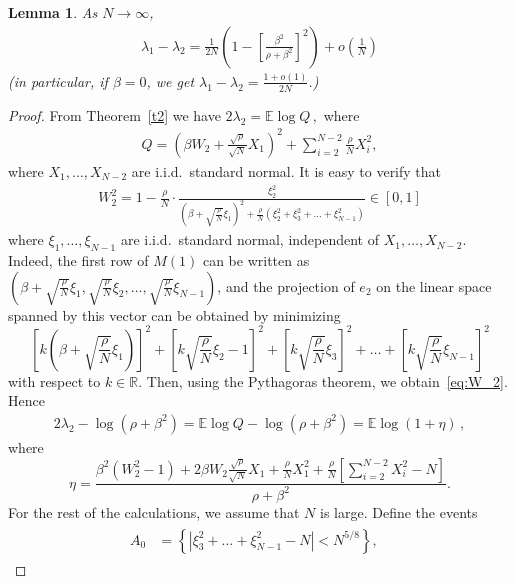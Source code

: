 \documentclass[12pt]{article}
\newtheorem{lemma}{Lemma}
\newcommand{\E}{\mathbb{E}}
\newcommand{\R}{\mathbb{R}}
\newcommand{\1}{\mathbf{1}}
\begin{document}
\begin{lemma}\label{lem:lam1lam2}
As $N\to\infty$,
\begin{align}\label{eq:lam1lam2}
\lambda_1-\lambda_2=\frac1{2N}
\left(1-\left[\frac{\beta^2}{\rho+\beta^2}\right]^2\right)+o\left(\frac1N\right) 
\end{align}
(in particular, if $\beta=0$, we get $\lambda_1-\lambda_2=\frac{1+o(1)}{2N}$.)
\end{lemma}
\begin{proof}
From Theorem~\ref{t2} we have
$2\lambda_2=\E\log Q\,,$ 
where
\begin{align}\label{eq:Q}
Q=\left(\beta W_2 + \frac{\sqrt{\rho}}{\sqrt{N}}X_1\right)^2 + \sum_{i=2}^{N-2}\frac{\rho}{N} X_i^2,    
\end{align}
where $X_1, \dots, X_{N-2}$ are i.i.d.~standard normal. It is easy to verify that 
\begin{align}\label{eq:W_2}
W_2^2=1-\frac{\rho}{N}\cdot
\frac{\xi_2^2}{\left(\beta+\sqrt{\frac{\rho}{N}}\xi_1\right)^2
+\frac{\rho}{N}\left(\xi_2^2+\xi_3^2+\dots+\xi_{N-1}^2\right)}
\in [0,1]
\end{align}
where $\xi_1, \dots, \xi_{N-1}$ are i.i.d.\ standard normal, independent of $X_1, \dots, X_{N-2}$.
{Indeed, the first row of $M(1)$ can be written as $\left(\beta + \sqrt{\frac \rho N}\xi_1,\sqrt{\frac \rho N}\xi_2,\dots,\sqrt{\frac \rho N}\xi_{N-1}\right)$, and the projection of $e_2$ on the linear space spanned by this vector can be obtained by minimizing 
$$
\left[k\left(\beta + \sqrt{\frac \rho N}\xi_1 \right)\right]^2
+\left[k\sqrt{\frac \rho N}\xi_2-1\right]^2
+\left[k\sqrt{\frac \rho N}\xi_3\right]^2
+\dots
+\left[k\sqrt{\frac \rho N}\xi_{N-1}\right]^2
$$
with respect to $k\in\R$.
Then, using the Pythagoras theorem, we obtain~\eqref{eq:W_2}.}
Hence
\begin{align}
\label{eq:lambda2eta}
2\lambda_2-\log(\rho+\beta^2)=\E\log Q-\log(\rho+\beta^2)=\mathbb{E}\log\left(
1+\eta\right)\,,    
\end{align} 
where 
$$
\eta=\frac{\beta^2 (W_2^2-1) + 
2\beta W_2\frac{\sqrt{\rho}}{\sqrt N} X_1
+ \frac{\rho}{N}X_1^2+\frac{\rho}{N}\left[\sum_{i=2}^{N-2} X_i^2 -N\right]}
{\rho+\beta^2}.
$$
For the rest of the calculations, we assume that $N$ is large. Define the events 
\begin{align*}
\begin{array}{clrl}
A_0&=\left\{|\xi_3^2+\dots+\xi_{N-1}^2-N|<N^{5/8}\right\}, &

\end{array}
\end{align*}
\end{proof}
\end{document}
